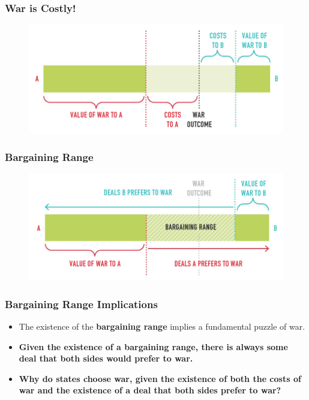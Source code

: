 \documentclass[handout]{beamer}
\begin{document}
\begin{frame} 
\frametitle{\LARGE{War is Costly!}}
\begin{figure}[ht!]
	\centering
	\includegraphics[width=\textwidth,height=0.8\textheight,keepaspectratio]{./barg3.png}
\end{figure}
\end{frame}

\begin{frame} 
\frametitle{\LARGE{Bargaining Range}}
\begin{figure}[ht!]
	\centering
	\includegraphics[width=\textwidth,height=0.8\textheight,keepaspectratio]{./barg4.png}
\end{figure}
\end{frame}

\begin{frame} 
	\frametitle{\LARGE{Bargaining Range Implications}}
	\begin{itemize}
		\item The existence of the \textbf{bargaining range} implies a fundamental puzzle of war. \pause
		\item \textbf{Given the existence of a bargaining range, there is always some deal that both sides would prefer to war.} \pause
		\item \textbf{Why do states choose war, given the existence of both the costs of war and the existence of a deal that both sides prefer to war?}
	\end{itemize}
\end{frame}
\end{document}
